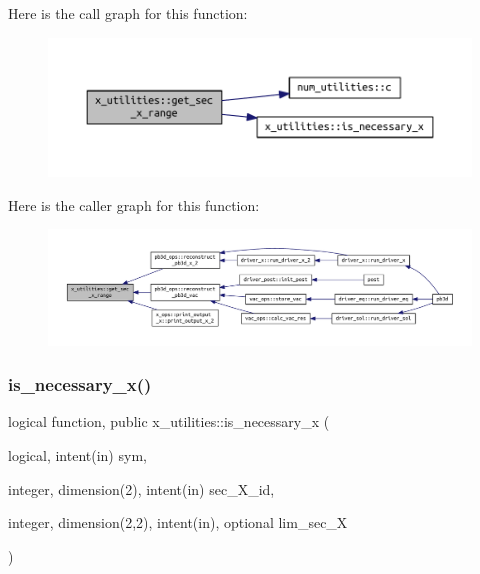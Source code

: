 Here is the call graph for this function\+:\nopagebreak
\begin{figure}[H]
\begin{center}
\leavevmode
\includegraphics[width=350pt]{namespacex__utilities_a6072ddd1fd230758795ff320c75a1f6a_cgraph}
\end{center}
\end{figure}
Here is the caller graph for this function\+:\nopagebreak
\begin{figure}[H]
\begin{center}
\leavevmode
\includegraphics[width=350pt]{namespacex__utilities_a6072ddd1fd230758795ff320c75a1f6a_icgraph}
\end{center}
\end{figure}
\mbox{\label{namespacex__utilities_a689aca7fedb49c43c5a65a18d557259f}} 
\subsubsection{\texorpdfstring{is\+\_\+necessary\+\_\+x()}{is\_necessary\_x()}}
{\footnotesize\ttfamily logical function, public x\+\_\+utilities\+::is\+\_\+necessary\+\_\+x (\begin{DoxyParamCaption}\item[{logical, intent(in)}]{sym,  }\item[{integer, dimension(2), intent(in)}]{sec\+\_\+\+X\+\_\+id,  }\item[{integer, dimension(2,2), intent(in), optional}]{lim\+\_\+sec\+\_\+X }\end{DoxyParamCaption})}



